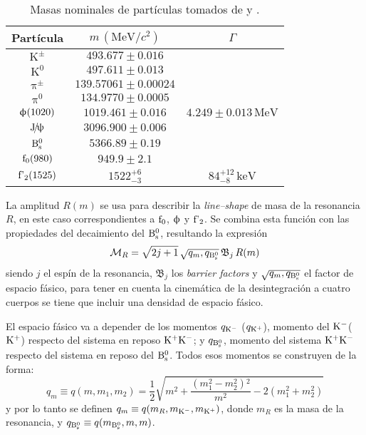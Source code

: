 \begin{table}[H]
  \centering
  \begin{tabular}{ccc}
\toprule
Partícula & $m \, (\text{MeV}/c^2)$  & $\Gamma$ \\ \midrule
$\mathrm{K^{\pm}}$    & $ 493.677\pm0.016 $\\
$\mathrm{K^{0}}$      & $497.611\pm0.013$\\
$\uppi^{\pm}$         & $139.57061\pm0.00024$\\
$\uppi^{0}$           & $134.9770\pm0.0005$\\
$\upphi (1020)$         & $1019.461\pm0.016$  & $4.249\pm0.013 \, \text{MeV}$\\
$\text{J}\!/\!\uppsi$               & $3096.900\pm0.006$  \\%
$\text{B}{}_{\text{s}}^{\text{0}}$                 & $5366.89\pm0.19$ \\ \midrule
$\text{f}_0 (980)$        & $949.9\pm2.1$ \\
$\text{f'}_2 (1525)$       & $1522_{-3}^{+6}$          & $84_{-8}^{+12} \, \text{keV}$\\
\bottomrule
  \end{tabular}
  \caption{Masas nominales de partículas tomados de \cite[primer bloque]{pdg2018} y \cite[segundo bloque]{Aaij:1664567}.} \label{tab_massPDG}
\end{table}
\color{norm}


\color{new}
La amplitud $R(m)$ se usa para describir la \emph{line--shape} de masa de la resonancia $R$, en este caso correspondientes a $\text{f}_0$, $\upphi$ y $\text{f'}_2$. Se combina esta función con las propiedades del decaimiento del $\text{B}{}_{\text{s}}^{\text{0}}$, resultando la expresión \cite{Aaij:1664567}  
\begin{equation}
  \mathcal{M}_R = \sqrt{2 j + 1}\, \sqrt{q_m,q_{\text{B}{}_{\text{s}}^{\text{0}}}} \,\mathfrak{B}_j \, R(m) \label{eq:masslineshape}
\end{equation}
siendo $j$ el espín de la resonancia, $\mathfrak{B}_j$ los \emph{barrier factors} y  $\sqrt{q_m,q_{\text{B}{}_{\text{s}}^{\text{0}}}}$ el factor de espacio fásico, para tener en cuenta la cinemática de la desintegración a cuatro cuerpos se tiene que incluir una densidad de espacio fásico.


El espacio fásico va a depender de los momentos $q_{\text{K}{}^{-}}$  ($q_{\text{K}{}^{+}}$), momento del $\text{K}{}^{-}$($\text{K}{}^{+}$) respecto del sistema en reposo $\text{K}{}^{+}\text{K}{}^{-}$; y  $q_{\text{B}{}_{\text{s}}^{\text{0}}}$, momento del sistema $\text{K}{}^{+}\text{K}{}^{-}$ respecto del sistema en reposo del $\text{B}{}_{\text{s}}^{\text{0}}$. Todos esos momentos se construyen de la forma:
\begin{equation}
q_m \equiv q(m,m_1,m_2) = \frac{1}{2}  \sqrt{m^2+\frac{\left(m_1^2-m_2^2\right){}^2}{m^2}-2 \left(m_1^2+m_2^2\right)}	
\end{equation}
y por lo tanto se definen $q_m \equiv q(m_R,m_{\text{K}{}^{-}},m_{\text{K}{}^{+}})$, donde $m_R$ es la masa de la resonancia, y $q_{\text{B}{}_{\text{s}}^{\text{0}}} \equiv q(m_{\text{B}{}_{\text{s}}^{\text{0}}},m,m)$.




